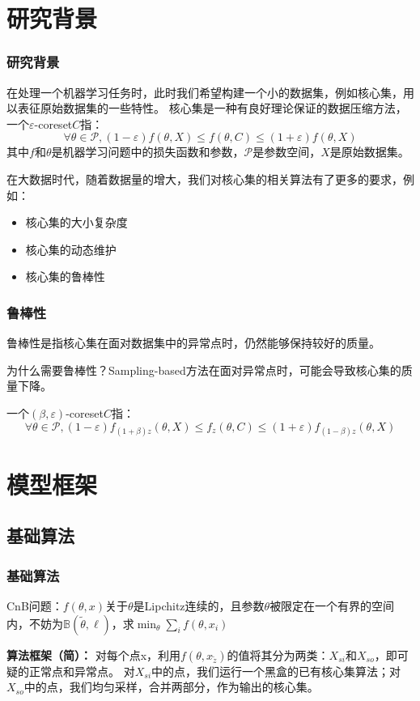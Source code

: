\documentclass[aspectratio=169]{ctexbeamer}
\begin{document}
\section{研究背景}
\begin{frame}
  \frametitle{研究背景}
在处理一个机器学习任务时，此时我们希望构建一个小的数据集，例如核心集，用以表征原始数据集的一些特性。
核心集是一种有良好理论保证的数据压缩方法，一个$\varepsilon$-coreset$C$指：
\begin{equation*}
  \forall \theta \in \mathcal{P},(1-\varepsilon)f(\theta,X)\leq f(\theta,C)    \leq(1+\varepsilon)f(\theta,X)
\end{equation*}
其中$f$和$\theta$是机器学习问题中的损失函数和参数，$\mathcal{P}$是参数空间，$X$是原始数据集。

在大数据时代，随着数据量的增大，我们对核心集的相关算法有了更多的要求，例如：
\begin{itemize}
  \item 核心集的大小复杂度
  \item 核心集的动态维护
  \item 核心集的鲁棒性
\end{itemize}
\end{frame}

\begin{frame}
  \frametitle{鲁棒性}
  鲁棒性是指核心集在面对数据集中的异常点时，仍然能够保持较好的质量。

  为什么需要鲁棒性？Sampling-based方法在面对异常点时，可能会导致核心集的质量下降。
  \pause
  
  一个$(\beta,\varepsilon)$-coreset$C$指：
  \begin{equation*}
    \forall \theta \in \mathcal{P},(1-\varepsilon)f_{(1+\beta)z}(\theta,X)\leq f_z(\theta,C)    \leq(1+\varepsilon)f_{(1-\beta)z}(\theta,X)
  \end{equation*}
\end{frame}


\section{模型框架}
\subsection{基础算法}
\begin{frame}
  \frametitle{基础算法}
  CnB问题：$f(\theta,x)$关于$\theta$是Lipchitz连续的，且参数$\theta$被限定在一个有界的空间内，不妨为$\mathbb{B}(\tilde{\theta},\ell)$，求$\min_\theta \sum_if(\theta,x_i)$
  
  \textbf{算法框架（简）：} 对每个点x，利用$f(\theta,x_{\tilde{z}})$的值将其分为两类：$X_{si}$和$X_{so}$，即可疑的正常点和异常点。
  对$X_{si}$中的点，我们运行一个黑盒的已有核心集算法；对$X_{so}$中的点，我们均匀采样，合并两部分，作为输出的核心集。
\end{frame}
\end{document}
